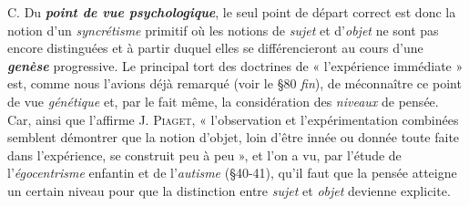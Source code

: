C. Du \textbf{\textit {point de vue psychologique}}, le seul point de départ correct
est donc la notion d’un {\it syncrétisme} primitif où les notions de {\it sujet} et
d’{\it objet} ne sont pas encore distinguées et à partir duquel elles se différencieront
au cours d’une \textbf{\textit {genèse}} progressive. Le principal tort des
doctrines de « l’expérience immédiate » est, comme nous l’avions déjà
remarqué (voir le \S 80 {\it fin}), de méconnaître ce point de vue {\it génétique}
et, par le fait même, la considération des {\it niveaux} de pensée. Car,
ainsi que l’affirme J. \textsc{Piaget}, « l'observation et l’expérimentation
combinées semblent démontrer que la notion d’objet, loin d’être
innée ou donnée toute faite dans l’expérience, se construit peu à peu »,
et l’on a vu, par l’étude de l’{\it égocentrisme} enfantin et de l’{\it autisme}
(\S 40-41), qu’il faut que la pensée atteigne un certain niveau pour que
la distinction entre {\it sujet} et {\it objet} devienne explicite.

